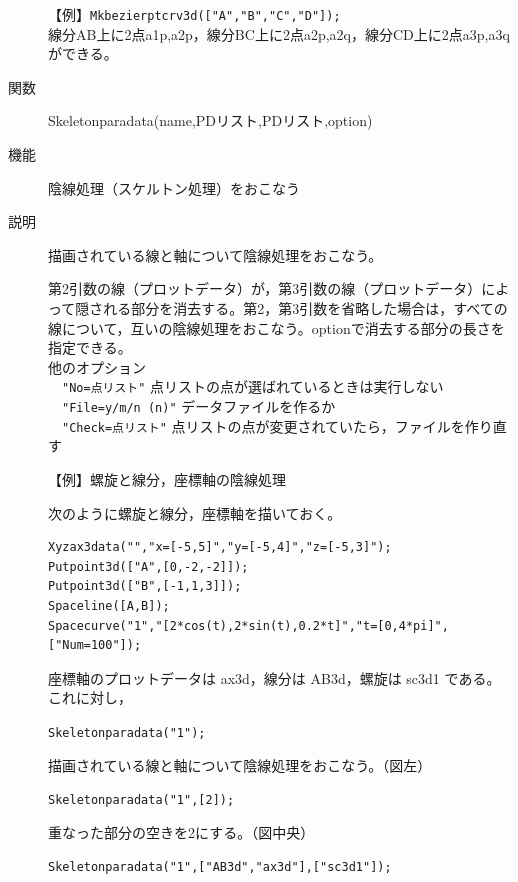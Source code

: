 \documentclass[papersize,a4paper,12pt,uplatex]{jsarticle}
\begin{document}
\begin{description}
\vspace{\baselineskip}
【例】\verb|Mkbezierptcrv3d(["A","B","C","D"]);|\\
線分AB上に2点a1p,a2p，線分BC上に2点a2p,a2q，線分CD上に2点a3p,a3qができる。

\vspace{\baselineskip}

\hypertarget{skeletonparadata}{}
\item[関数]Skeletonparadata(name,PDリスト,PDリスト,option)
\item[機能]陰線処理（スケルトン処理）をおこなう
\item[説明]描画されている線と軸について陰線処理をおこなう。

第2引数の線（プロットデータ）が，第3引数の線（プロットデータ）によって隠される部分を消去する。第2，第3引数を省略した場合は，すべての線について，互いの陰線処理をおこなう。optionで消去する部分の長さを指定できる。\\
他のオプション\\
　\verb|"No=点リスト"| 点リストの点が選ばれているときは実行しない\\
　\verb|"File=y/m/n (n)"| データファイルを作るか\\
　\verb|"Check=点リスト"| 点リストの点が変更されていたら，ファイルを作り直す


\vspace{\baselineskip}
【例】螺旋と線分，座標軸の陰線処理

次のように螺旋と線分，座標軸を描いておく。
\begin{verbatim}
Xyzax3data("","x=[-5,5]","y=[-5,4]","z=[-5,3]");
Putpoint3d(["A",[0,-2,-2]]);
Putpoint3d(["B",[-1,1,3]]);
Spaceline([A,B]);
Spacecurve("1","[2*cos(t),2*sin(t),0.2*t]","t=[0,4*pi]",["Num=100"]);
\end{verbatim}
座標軸のプロットデータは ax3d，線分は AB3d，螺旋は sc3d1 である。これに対し，

\hspace{10mm} \verb|Skeletonparadata("1");|

 描画されている線と軸について陰線処理をおこなう。（図左）

\hspace{10mm} \verb|Skeletonparadata("1",[2]);|

 重なった部分の空きを2にする。（図中央）
 
\hspace{10mm} \verb|Skeletonparadata("1",["AB3d","ax3d"],["sc3d1"]);|


\end{description}
\end{document}
